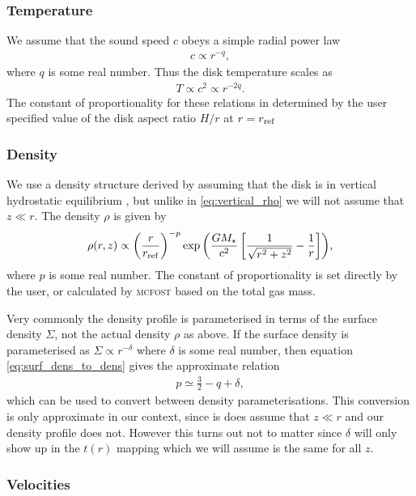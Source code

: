 \subsubsection{Temperature}

We assume that the sound speed $c$ obeys a simple radial power law 
\begin{align}
    c \propto r^{-q},
\end{align}
where $q$ is some real number. Thus the disk temperature scales as 
\begin{align}
    T \propto c^2 \propto r^{-2q}.
\end{align}
The constant of proportionality for these relations in determined by the user specified value of the disk aspect ratio $H/r$ at $r=r_{\rm ref}$

\subsubsection{Density}

We use a density structure derived by assuming that the disk is in vertical hydrostatic equilibrium \citep{pringle1981}, but unlike in \ref{eq:vertical_rho} we will not assume that $z\ll r$.
The density $\rho$ is given by 
\begin{align}
    \rho(r,z) \propto \left( \frac{r}{r_{\rm ref}} \right)^{-p} \exp{\left( \frac{G M_\star}{c^2} \left[ \frac{1}{\sqrt{r^2 + z^2}} - \frac{1}{r} \right] \right)},
\end{align}
where $p$ is some real number. 
The constant of proportionality is set directly by the user, or calculated by \textsc{mcfost} based on the total gas mass.

Very commonly the density profile is parameterised in terms of the surface density $\Sigma$, not the actual density $\rho$ as above.
If the surface density is parameterised as $\Sigma \propto r^{-\delta}$ where $\delta$ is some real number, then equation \ref{eq:surf_dens_to_dens} gives the approximate relation 
\begin{align}
    p \simeq \frac{3}{2} - q + \delta,
\end{align}
which can be used to convert between density parameterisations.
This conversion is only approximate in our context, since is does assume that $z \ll r$ and our density profile does not.
However this turns out not to matter since $\delta$ will only show up in the $t(r)$ mapping which we will assume is the same for all $z$.

\subsubsection{Velocities}

